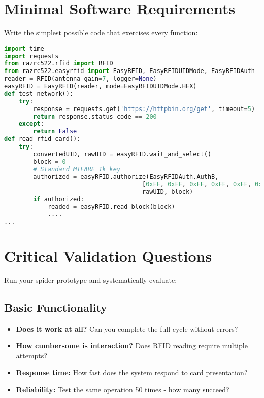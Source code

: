 \section{Minimal Software Requirements}

Write the simplest possible code that exercises every function:

\begin{tcolorbox}[colback=gray!5,colframe=gray!50,title=Basic Validation Script]
\begin{lstlisting}[language=Python,basicstyle=\small\ttfamily]
import time
import requests
from razrc522.rfid import RFID
from razrc522.easyrfid import EasyRFID, EasyRFIDUIDMode, EasyRFIDAuth
reader = RFID(antenna_gain=7, logger=None)
easyRFID = EasyRFID(reader, mode=EasyRFIDUIDMode.HEX)
def test_network():
    try:
        response = requests.get('https://httpbin.org/get', timeout=5)
        return response.status_code == 200
    except:
        return False
def read_rfid_card():
    try:
        convertedUID, rawUID = easyRFID.wait_and_select()
        block = 0
        # Standard MIFARE 1k key
        authorized = easyRFID.authorize(EasyRFIDAuth.AuthB, 
                                      [0xFF, 0xFF, 0xFF, 0xFF, 0xFF, 0xFF], 
                                      rawUID, block)
        if authorized:
            readed = easyRFID.read_block(block)
            ....
...
\end{lstlisting}
\end{tcolorbox}

\section{Critical Validation Questions}

Run your spider prototype and systematically evaluate:

\subsection{Basic Functionality}
\begin{itemize}
\item \textbf{Does it work at all?} Can you complete the full cycle without errors?
\item \textbf{How cumbersome is interaction?} Does RFID reading require multiple attempts?
\item \textbf{Response time:} How fast does the system respond to card presentation?
\item \textbf{Reliability:} Test the same operation 50 times - how many succeed?
\end{itemize}

